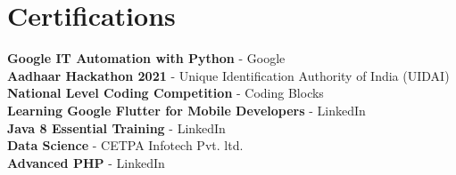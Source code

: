 \documentclass[]{deedy-resume-openfont}
\begin{document}
\begin{minipage}[t]{0.4\textwidth}


\section{Certifications}

\textbf{Google IT Automation with Python} - Google\\
\textbf{Aadhaar Hackathon 2021} - Unique Identification Authority of India (UIDAI)\\
\textbf{National Level Coding Competition} - Coding Blocks\\
\textbf{Learning Google Flutter for Mobile Developers} - LinkedIn\\
\textbf{Java 8 Essential Training} - LinkedIn\\
\textbf{Data Science} - CETPA Infotech Pvt. ltd.\\
\textbf{Advanced PHP} - LinkedIn\\

%
%

\end{minipage} 
\hfill
\end{document}
